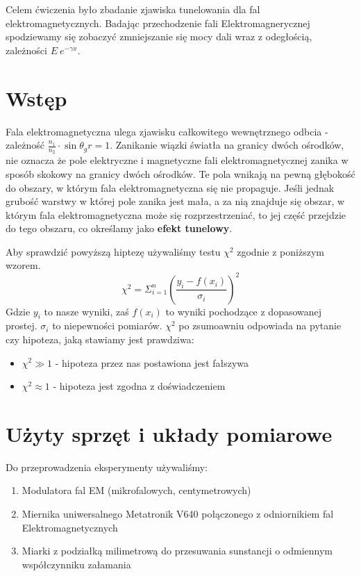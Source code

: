 \documentclass[a4paper,12pt]{article}
\begin{document}
Celem ćwiczenia było zbadanie zjawiska tunelowania dla fal elektromagnetycznych. Badając przechodzenie fali Elektromagnerycznej spodziewamy się zobaczyć zmniejszanie się mocy dali wraz z odegłością, zależności $E~e^{-\gamma x}$. 

\section{Wstęp}

Fala elektromagnetyczna ulega zjawisku całkowitego wewnętrznego odbcia - zależność $\frac{n_1}{n_2}\cdot \sin \theta_gr = 1 $. Zanikanie wiązki światła na granicy dwóch ośrodków, nie oznacza że pole elektryczne i magnetyczne fali elektromagnetycznej zanika w sposób skokowy na granicy dwóch ośrodków. Te pola wnikają na pewną głębokość do obszary, w którym fala elektromagnetyczna się nie propaguje. 
Jeśli jednak grubość warstwy w której pole zanika jest mała, a za nią znajduje się obszar, w którym fala elektromagnetyczna może się rozprzestrzeniać, to jej część przejdzie do tego obszaru, co określamy jako \textbf{efekt tunelowy}.



Aby sprawdzić powyższą hiptezę używaliśmy testu $\chi^2$ zgodnie z poniższym wzorem. 
$$
\chi^2 = \Sigma_{i=1}^n {\left( \frac{y_i - f(x_i)}{\sigma_i} \right)}^2
$$
Gdzie $y_i$ to nasze wyniki, zaś $f(x_i)$ to wyniki pochodzące z dopasowanej prostej. $\sigma_i$ to niepewności pomiarów. 
$\chi^2$ po zsumoawniu odpowiada na pytanie czy hipoteza, jaką stawiamy jest prawdziwa: 
\begin{itemize}
  \item $\chi^2 \gg 1$ - hipoteza przez nas postawiona jest fałszywa 
  \item $\chi^2 \approx 1$ - hipoteza jest zgodna z doświadczeniem
\end{itemize}




\section{Użyty sprzęt i układy pomiarowe}

Do przeprowadzenia eksperymenty używaliśmy: 

\begin{enumerate}
  \item Modulatora fal EM (mikrofalowych, centymetrowych) 
  \item Miernika uniwersalnego Metatronik V640 połączonego z odniornikiem fal Elektromagnetycznych
  \item Miarki z podziałką milimetrową do przesuwania sunstancji o odmiennym współczynniku załamania
  
\end{enumerate}
\end{document}

